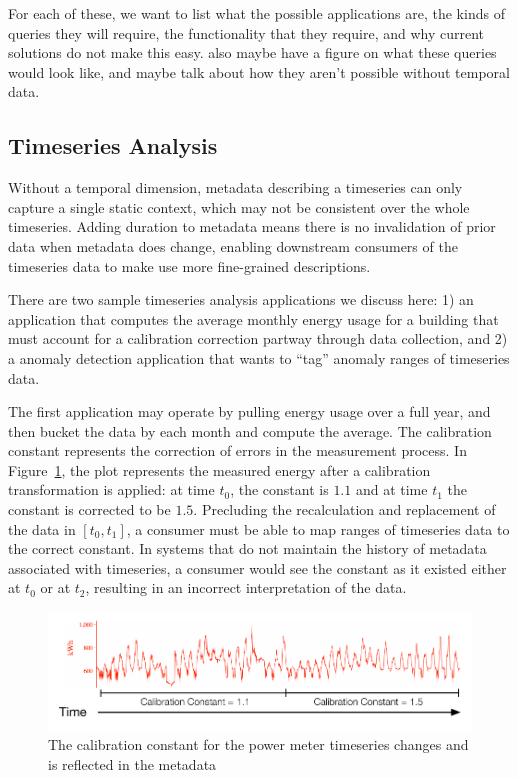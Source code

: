 For each of these, we want to list what the possible applications are,
the kinds of queries they will require, the functionality that they require,
and why current solutions do not make this easy. also maybe have a figure
on what these queries would look like, and maybe talk about how they aren't possible
without temporal data.
\fi

\subsection{Timeseries Analysis}

Without a temporal dimension, metadata describing a timeseries can only
capture a single static context, which may not be consistent over the
whole timeseries. Adding duration to metadata means there is no invalidation
of prior data when metadata does change, enabling downstream consumers
of the timeseries data to make use more fine-grained descriptions.

There are two sample timeseries analysis applications we discuss here: 1) an
application that computes the average monthly energy usage for a building that
must account for a calibration correction partway through data collection, and
2) a anomaly detection application that wants to ``tag'' anomaly ranges of
timeseries data.

The first application may operate by pulling energy usage over a full year,
and then bucket the data by each month and compute the average. The calibration
constant represents the correction of errors in the measurement process. In Figure~\ref{fig:calibrationconstant},
the plot represents the measured energy after a calibration transformation is applied: at time $t_0$, the constant
is $1.1$ and at time $t_1$ the constant is corrected to be $1.5$. Precluding the recalculation and replacement
of the data in $[t_0, t_1]$, a consumer must be able to map ranges of timeseries data to the correct
constant. In systems that do not maintain the history of metadata associated with timeseries, a consumer would
see the constant as it existed either at $t_0$ or at $t_2$, resulting in an incorrect interpretation of the data.

\begin{figure}
\centering
\includegraphics[width=.9\linewidth]{figs/calibrationconstant.pdf}
\caption{The calibration constant for the power meter timeseries changes and is reflected
in the metadata}
\label{fig:calibrationconstant}
\end{figure}

